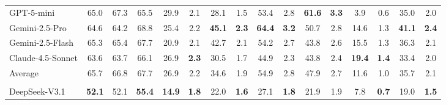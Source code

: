 \begin{table}[!t]
{\begin{tabular}{lccccccccccccccc}
\multicolumn{1}{l|}{GPT-5-mini}                           & 65.0          & 67.3          & \multicolumn{1}{c|}{65.5}          & 29.9          & 2.1          & 28.1           & 1.5          & 53.4           & 2.8          & \cellcolor{LightCyan}\textbf{61.6} & \cellcolor{LightCyan}\textbf{3.3} & 3.9           & \multicolumn{1}{c|}{0.6}          & 35.0          & 2.0          \\
\multicolumn{1}{l|}{Gemini-2.5-Pro}                       & 64.6          & 64.2          & \multicolumn{1}{c|}{68.8}          & 25.4          & 2.2          & \cellcolor{LightCyan}\textbf{45.1}  & \cellcolor{LightCyan}\textbf{2.3} & \cellcolor{LightCyan}\textbf{64.4}  & \cellcolor{LightCyan}\textbf{3.2} & 50.7          & 2.8          & 14.6          & \multicolumn{1}{c|}{1.3}          & \cellcolor{LightCyan}\textbf{41.1} & \cellcolor{LightCyan}\textbf{2.4} \\
\multicolumn{1}{l|}{Gemini-2.5-Flash}                     & 65.3          & 65.4          & \multicolumn{1}{c|}{67.7}          & 20.9          & 2.1          & 42.7           & 2.1          & 54.2           & 2.7          & 43.8          & 2.6          & 15.5          & \multicolumn{1}{c|}{1.3}          & 36.3          & 2.1          \\
\multicolumn{1}{l|}{Claude-4.5-Sonnet}                    & 63.6          & 63.7          & \multicolumn{1}{c|}{66.1}          & 26.9          & \cellcolor{LightCyan}\textbf{2.3}          & 30.5           & 1.7          & 44.9           & 2.3          & 43.8          & 2.4          & \cellcolor{LightCyan}\textbf{19.4} & \multicolumn{1}{c|}{\cellcolor{LightCyan}\textbf{1.4}} & 33.4          & 2.0          \\ \midrule
\multicolumn{1}{l|}{Average}                              & 65.7          & 66.8          & \multicolumn{1}{c|}{67.7}          & 26.9          & 2.2          & 34.6           & 1.9          & 54.9           & 2.8          & 47.9          & 2.7          & 11.6          & \multicolumn{1}{c|}{1.0}          & 35.7          & 2.1          \\ \midrule \midrule
\rowcolor{COLOR_MEAN}
\multicolumn{16}{l}{Open-source Large Language Models}                                                                                                                                                                                                                                                                                          \\
\multicolumn{1}{l|}{DeepSeek-V3.1}                        & \cellcolor{LightCyan}\textbf{52.1} & 52.1          & \multicolumn{1}{c|}{\cellcolor{LightCyan}\textbf{55.4}} & \cellcolor{LightCyan}\textbf{14.9} & \cellcolor{LightCyan}\textbf{1.8} & 22.0           & \cellcolor{LightCyan}\textbf{1.6} & 27.1           & \cellcolor{LightCyan}\textbf{1.8} & 21.9          & 1.9          & 7.8           & \multicolumn{1}{c|}{\cellcolor{LightCyan}\textbf{0.7}} & 19.0          & \cellcolor{LightCyan}\textbf{1.5} \\

\end{tabular}}
\end{table}
